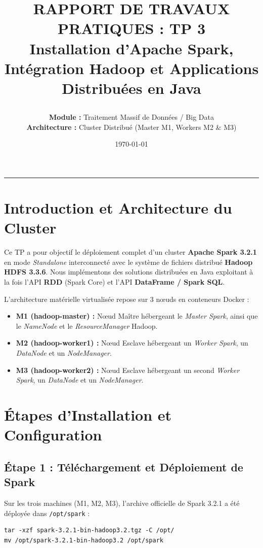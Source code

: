 \documentclass[11pt,a4paper]{article}
\title{
    \vspace{-1.5cm}
    \begin{tcolorbox}[colback=primaryblue,colframe=primaryblue,arc=3mm,center]
        \centering \color{white}
        \LARGE \textbf{RAPPORT DE TRAVAUX PRATIQUES : TP 3} \\[0.3cm]
        \large \textbf{Installation d'Apache Spark, Intégration Hadoop et Applications Distribuées en Java}
    \end{tcolorbox}
    \vspace{-0.5cm}
}
\author{\textbf{Module :} Traitement Massif de Données / Big Data \\ \textbf{Architecture :} Cluster Distribué (Master M1, Workers M2 \& M3)}
\date{\today}
\begin{document}
\maketitle

\vspace{-0.5cm}
\tableofcontents
\vspace{0.5cm}
\hrule
\vspace{0.8cm}

\section{Introduction et Architecture du Cluster}

Ce TP a pour objectif le déploiement complet d'un cluster \textbf{Apache Spark 3.2.1} en mode \textit{Standalone} interconnecté avec le système de fichiers distribué \textbf{Hadoop HDFS 3.3.6}. Nous implémentons des solutions distribuées en Java exploitant à la fois l'API \textbf{RDD} (Spark Core) et l'API \textbf{DataFrame / Spark SQL}.

L'architecture matérielle virtualisée repose sur 3 nœuds en conteneurs Docker :
\begin{itemize}
    \item \textbf{M1 (hadoop-master) :} Nœud Maître hébergeant le \textit{Master Spark}, ainsi que le \textit{NameNode} et le \textit{ResourceManager} Hadoop.
    \item \textbf{M2 (hadoop-worker1) :} Nœud Esclave hébergeant un \textit{Worker Spark}, un \textit{DataNode} et un \textit{NodeManager}.
    \item \textbf{M3 (hadoop-worker2) :} Nœud Esclave hébergeant un second \textit{Worker Spark}, un \textit{DataNode} et un \textit{NodeManager}.
\end{itemize}

\section{Étapes d'Installation et Configuration}

\subsection{Étape 1 : Téléchargement et Déploiement de Spark}
Sur les trois machines (M1, M2, M3), l'archive officielle de Spark 3.2.1 a été déployée dans \texttt{/opt/spark} :
\begin{lstlisting}[style=custombash]
tar -xzf spark-3.2.1-bin-hadoop3.2.tgz -C /opt/
mv /opt/spark-3.2.1-bin-hadoop3.2 /opt/spark
\end{lstlisting}
\end{document}
